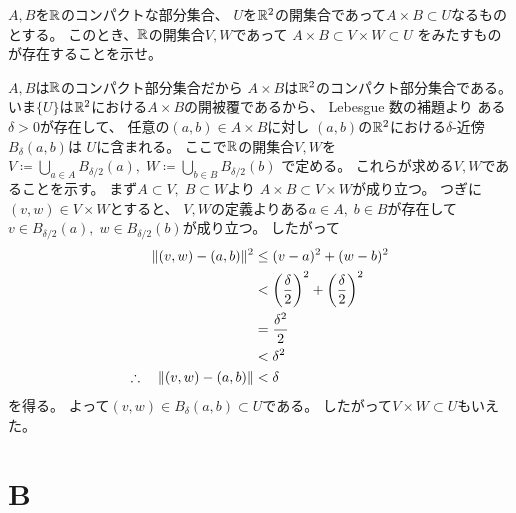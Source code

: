 \documentclass[report]{jlreq}
\begin{document}
\begin{problem}[第3問]
    $A, B$を$\mathbb{R}$のコンパクトな部分集合、
    $U$を$\mathbb{R}^2$の開集合であって$A \times B \subset U$なるものとする。
    このとき、$\mathbb{R}$の開集合$V, W$であって
    $A \times B \subset V \times W \subset U$
    をみたすものが存在することを示せ。
\end{problem}

\begin{answer}
    $A, B$は$\mathbb{R}$のコンパクト部分集合だから
    $A \times B$は$\mathbb{R}^2$のコンパクト部分集合である。
    いま$\{ U \}$は$\mathbb{R}^2$における$A \times B$の開被覆であるから、
    Lebesgue 数の補題より
    ある$\delta > 0$が存在して、
    任意の$(a, b) \in A \times B$に対し
    $(a, b)$の$\mathbb{R}^2$における$\delta$-近傍$B_\delta (a, b)$は
    $U$に含まれる。
    ここで$\mathbb{R}$の開集合$V, W$を
    $V \coloneqq \bigcup_{a \in A} B_{\delta / 2}(a), \;
        W \coloneqq \bigcup_{b \in B} B_{\delta / 2}(b)$
    で定める。
    これらが求める$V, W$であることを示す。
    まず$A \subset V, \; B \subset W$より
    $A \times B \subset V \times W$が成り立つ。
    つぎに$(v, w) \in V \times W$とすると、
    $V, W$の定義よりある$a \in A, \; b \in B$が存在して
    $v \in B_{\delta / 2}(a), \; w \in B_{\delta / 2}(b)$が成り立つ。
    したがって
    \begin{alignat}{1}
        \| (v, w) - (a, b) \|^2
            &\le (v - a)^2 + (w - b)^2 \\
            &< \left({\frac{\delta}{2}}\right)^2 + \left({\frac{\delta}{2}}\right)^2 \\
            &= \frac{\delta^2}{2} \\
            &< \delta^2 \\
        \therefore \quad \| (v, w) - (a, b) \|
            &< \delta
    \end{alignat}
    を得る。
    よって$(v, w) \in B_\delta (a, b) \subset U$である。
    したがって$V \times W \subset U$もいえた。
\end{answer}



%
\section{B}
\end{document}
